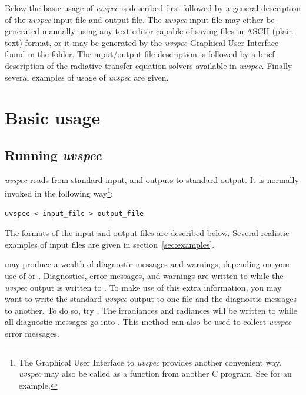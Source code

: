 Below the basic usage of {\sl uvspec} is described first followed by
a general description of the {\sl uvspec} input file and output file. The
{\sl uvspec} input file may either be generated manually using any
text editor capable of saving files in ASCII (plain text) format, or
it may be generated by the {\sl uvspec} Graphical User Interface
found in the  folder. The input/output file description is 
followed by a brief description of the radiative transfer equation solvers 
available in {\sl uvspec}. Finally several examples of usage of {\sl uvspec} 
are given.

\section{Basic usage}

\subsection{Running {\sl uvspec}}

{\sl uvspec} reads 
from standard input, and outputs to standard output. It is normally
invoked in the following way\footnote{The Graphical User Interface to
{\sl uvspec} provides another convenient way.  {\sl uvspec}
may also be called as a function from another C program. See
 for an example.}:

\begin{Verbatim}[fontsize=\footnotesize] 
  uvspec < input_file > output_file
\end{Verbatim}
  
\noindent The formats of the input and output files are described
below. Several realistic examples of input files are 
given in section~\ref{sec:examples}.

 may produce a wealth of diagnostic
messages and warnings, depending on your use of  or
.  Diagnostics, error messages, and warnings are written
to  while the {\sl uvspec} output is written to
. To make use of this extra information, you may want to
write the standard {\sl uvspec} output to one file and the diagnostic
messages to another. To do so, try . The irradiances and radiances will be
written to  while all diagnostic messages go into
. This method can also be used to collect
{\sl uvspec} error messages.

